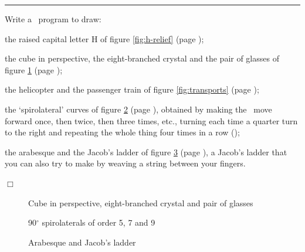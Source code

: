 \noindent \rule{137mm}{0.1mm}\par\nopagebreak %
\begin{exercices}{Write a \python\ program to draw:

\tiret the raised capital letter H of figure \ref{fig:h-relief} (page \pageref{fig:h-relief});

\tiret the cube in perspective, the eight-branched crystal and the pair of glasses of figure \ref{fig:crist+lun} (page \pageref{fig:crist+lun});

\tiret the helicopter and the passenger train of figure \ref{fig:transports} (page \pageref{fig:transports});

\tiret the `spirolateral' curves of figure \ref{fig:spiro} (page \pageref{fig:spiro}), obtained by making
the \robot\ move forward once, then twice, then three times, etc., turning each time a quarter turn to the right and repeating
the whole thing four times in a row (\cite{odds1});

\tiret the arabesque and the Jacob's ladder of figure \ref{fig:JacobArab} (page \pageref{fig:JacobArab}), a Jacob's ladder that you can also try to
make by weaving a string between your fingers.

\noindent $\Box$}\end{exercices}
\begin{figure}[htbp]
 \caption{Cube in perspective, eight-branched crystal and pair of glasses}
 \label{fig:crist+lun}
\end{figure}
\begin{figure}[htbp]
 \caption{90$^{\circ}$ spirolaterals of order 5, 7 and 9}
 \label{fig:spiro}
\end{figure}
\begin{figure}[htbp]
 \caption{Arabesque and Jacob's ladder}
 \label{fig:JacobArab}
\end{figure}


